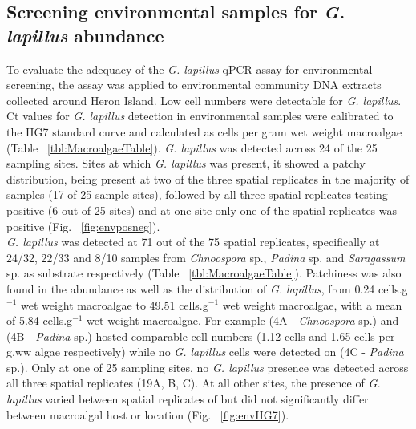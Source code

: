 \documentclass[12pt]{article}
\begin{document}
\subsection*{Screening environmental samples for \emph{G. lapillus} abundance }%
\FloatBarrier
To evaluate the adequacy of the \emph{G. lapillus} %
qPCR assay for environmental screening, the assay was applied to environmental community DNA extracts collected around Heron Island. 
Low cell numbers were detectable for \emph{G. lapillus}. 
Ct values for \emph{G. lapillus} detection in environmental samples were calibrated to the HG7 standard curve and calculated as cells per gram wet weight macroalgae (Table ~\ref{tbl:MacroalgaeTable}).  
\emph{G. lapillus} was detected across 24 of the 25 sampling sites. 
Sites at which \textit{G. lapillus} was present, it showed a patchy distribution, being present at two of the three spatial replicates in the majority of samples (17 of 25 sample sites), followed by all three spatial replicates testing positive (6 out of 25 sites) and at one site only one of the spatial replicates was positive (Fig. ~\ref{fig:envposneg}). \\
\emph{G. lapillus} was detected at 71 out of the 75 spatial replicates, specifically at 24/32, 22/33 and 8/10 samples from \emph{Chnoospora} sp., \emph{Padina} sp. and \emph{Saragassum} sp. as substrate respectively (Table ~\ref{tbl:MacroalgaeTable}).
Patchiness was also found in the abundance as well as the distribution of \emph{G. lapillus}, from 0.24 cells.g$^{-1}$ wet weight macroalgae to 49.51 cells.g$^{-1}$ wet weight macroalgae, with a mean of 5.84 cells.g$^{-1}$ wet weight macroalgae. 
For example (4A - \emph{Chnoospora} sp.) and (4B - \emph{Padina} sp.) hosted comparable cell numbers (1.12 cells and 1.65 cells per g.ww algae respectively) while no \emph{G. lapillus} cells were detected on (4C - \emph{Padina} sp.).
Only at one of 25 sampling sites, no \emph{G. lapillus} presence was detected across all three spatial replicates (19A, B, C).
At all other sites, the presence of \textit{G. lapillus} varied between spatial replicates of but did not significantly differ between macroalgal host or location (Fig. ~\ref{fig:envHG7}). 
\end{document}
